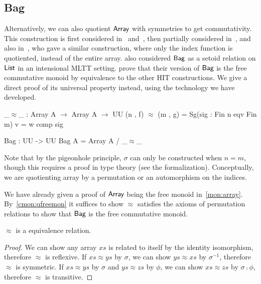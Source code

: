 \subsection{Bag}\label{cmon:bag}
Alternatively, we can also quotient $\operatorname{\mathsf{Array}}$ with symmetries to get commutativity.
%
This construction is first considered in~\cite{altenkirchDefinableQuotientsType2011}
and~\cite{liQuotientTypesType2015}, then partially considered in~\cite{choudhuryFreeCommutativeMonoids2023},
and also in~\cite{joramConstructiveFinalSemantics2023},
who gave a similar construction, where only the index function is quotiented, instead of
the entire array.
%
\cite{danielssonBagEquivalenceProofRelevant2012} also considered $\operatorname{\mathsf{Bag}}$ as a setoid relation
on $\operatorname{\mathsf{List}}$ in an intensional MLTT setting.
%
\cite{joramConstructiveFinalSemantics2023} prove that their version of $\operatorname{\mathsf{Bag}}$ is the free commutative monoid by
equivalence to the other HIT constructions.
%
We give a direct proof of its universal property instead, using the technology we have developed.

\begin{definition}[Bag]
    \label{def:bag}
    \leavevmode
    \begin{code}
_$\approx$_ : Array A $\to$ Array A $\to$ UU
(n , f) $\approx$ (m , g) = Sg(sig : Fin n eqv Fin m) v = w comp sig

Bag : UU -> UU
Bag A = Array A / _$\approx$_
    \end{code}
\end{definition}

Note that by the pigeonhole principle, $\sigma$ can only be constructed when $n = m$, though this requires a proof in
type theory (see the formalization).
%
Conceptually, we are quotienting array by a permutation or an automorphism on the indices.

We have already given a proof of $\operatorname{\mathsf{Array}}$ being the free monoid in~\cref{mon:array}.
%
By~\cref{cmon:qfreemon} it suffices to show $\approx$ satisfies the axioms of permutation relations to show that $\operatorname{\mathsf{Bag}}$
is the free commutative monoid.

\begin{proposition}
    $\approx$ is a equivalence relation.
\end{proposition}

\begin{proof}
    We can show any array $xs$ is related to itself by the identity isomorphism, therefore $\approx$ is reflexive.
    If $xs \approx ys$ by $\sigma$, we can show $ys \approx xs$ by $\sigma^{-1}$, therefore $\approx$ is symmetric.
    If $xs \approx ys$ by $\sigma$ and $ys \approx zs$ by $\phi$, we can show $xs \approx zs$ by $\sigma \comp \phi$,
    therefore $\approx$ is transitive.
\end{proof}

